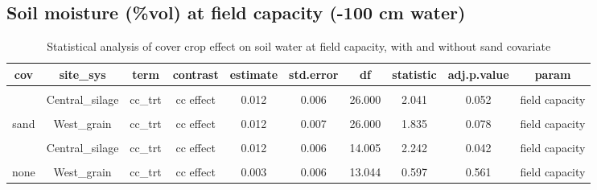 \documentclass[
]{article}
\begin{document}
\hypertarget{soil-moisture-vol-at-field-capacity--100-cm-water}{%
\subsection{Soil moisture (\%vol) at field capacity (-100 cm
water)}\label{soil-moisture-vol-at-field-capacity--100-cm-water}}

\begin{table}[H]

\caption{\label{tab:fc}Statistical analysis of cover crop effect on soil water at field capacity, with and without sand covariate}
\centering
\begin{tabular}[t]{cccccccccc}
\toprule
cov & site\_sys & term & contrast & estimate & std.error & df & statistic & adj.p.value & param\\
\midrule
\cellcolor{gray!6}{sand} & \cellcolor{gray!6}{Central\_grain} & \cellcolor{gray!6}{cc\_trt} & \cellcolor{gray!6}{cc effect} & \cellcolor{gray!6}{-0.002} & \cellcolor{gray!6}{0.006} & \cellcolor{gray!6}{26.000} & \cellcolor{gray!6}{-0.430} & \cellcolor{gray!6}{0.671} & \cellcolor{gray!6}{field capacity}\\
 & Central\_silage & cc\_trt & cc effect & 0.012 & 0.006 & 26.000 & 2.041 & 0.052 & field capacity\\

\cellcolor{gray!6}{sand} & \cellcolor{gray!6}{East\_grain} & \cellcolor{gray!6}{cc\_trt} & \cellcolor{gray!6}{cc effect} & \cellcolor{gray!6}{-0.002} & \cellcolor{gray!6}{0.006} & \cellcolor{gray!6}{26.000} & \cellcolor{gray!6}{-0.353} & \cellcolor{gray!6}{0.727} & \cellcolor{gray!6}{field capacity}\\
\multirow{-4}{*}{\centering\arraybackslash sand} & West\_grain & cc\_trt & cc effect & 0.012 & 0.007 & 26.000 & 1.835 & 0.078 & field capacity\\
\cmidrule{1-10}
\cellcolor{gray!6}{none} & \cellcolor{gray!6}{Central\_grain} & \cellcolor{gray!6}{cc\_trt} & \cellcolor{gray!6}{cc effect} & \cellcolor{gray!6}{-0.004} & \cellcolor{gray!6}{0.005} & \cellcolor{gray!6}{13.044} & \cellcolor{gray!6}{-0.800} & \cellcolor{gray!6}{0.438} & \cellcolor{gray!6}{field capacity}\\
 & Central\_silage & cc\_trt & cc effect & 0.012 & 0.006 & 14.005 & 2.242 & 0.042 & field capacity\\

\cellcolor{gray!6}{none} & \cellcolor{gray!6}{East\_grain} & \cellcolor{gray!6}{cc\_trt} & \cellcolor{gray!6}{cc effect} & \cellcolor{gray!6}{-0.007} & \cellcolor{gray!6}{0.006} & \cellcolor{gray!6}{13.044} & \cellcolor{gray!6}{-1.317} & \cellcolor{gray!6}{0.211} & \cellcolor{gray!6}{field capacity}\\
\multirow{-4}{*}{\centering\arraybackslash none} & West\_grain & cc\_trt & cc effect & 0.003 & 0.006 & 13.044 & 0.597 & 0.561 & field capacity\\
\bottomrule
\end{tabular}
\end{table}
\end{document}
